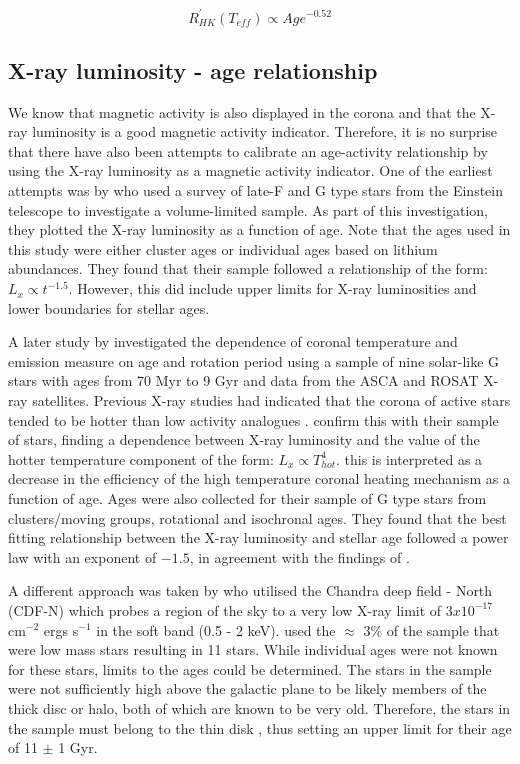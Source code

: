 \begin{equation}
    R^{'}_{HK}(T_{eff}) \propto Age^{-0.52}
    \label{Eq:LO_etal_18_law}
\end{equation}

\subsection{X-ray luminosity - age relationship}
\label{hist_xray_age_section}
We know that magnetic activity is also displayed in the corona and that the X-ray luminosity is a good magnetic activity indicator. Therefore, it is no surprise that there have also been attempts to calibrate an age-activity relationship by using the X-ray luminosity as a magnetic activity indicator. One of the earliest attempts was by \citet{Maggio_etal_1987} who used a survey of late-F and G type stars from the Einstein telescope to investigate a volume-limited sample. As part of this investigation, they plotted the X-ray luminosity as a function of age. Note that the ages used in this study were either cluster ages or individual ages based on lithium abundances. They found that their sample followed a relationship of the form: $L_{x} \propto t^{-1.5}$. However, this did include upper limits for X-ray luminosities and lower boundaries for stellar ages.

A later study by \citet{Gudel_etal_1997} investigated the dependence of coronal temperature and emission measure on age and rotation period using a sample of nine solar-like G stars with ages from 70 Myr to 9 Gyr and data from the ASCA and ROSAT X-ray satellites. Previous X-ray studies had indicated that the corona of active stars tended to be hotter than low activity analogues \citep{Schmitt_etal_1995}. \citet{Gudel_etal_1997} confirm this with their sample of stars, finding a dependence between X-ray luminosity and the value of the hotter temperature component of the form: $L_{x} \propto T_{hot}^{4}$. this is interpreted as a decrease in the efficiency of the high temperature coronal heating mechanism as a function of age. Ages were also collected for their sample of G type stars from clusters/moving groups, rotational and isochronal ages. They found that the best fitting relationship between the X-ray luminosity and stellar age followed a power law with an exponent of $-1.5$, in agreement with the findings of \citet{Maggio_etal_1987}.

A different approach was taken by \citet{Feigelson_etal_2004} who utilised the Chandra deep field - North (CDF-N) which probes a region of the sky to a very low X-ray limit of $3 x 10^{-17}$ cm$^{-2}$ ergs s$^{-1}$ in the soft band (0.5 - 2 keV). \citet{Feigelson_etal_2004} used the $\approx$ 3\% of the sample that were low mass stars resulting in 11 stars. While individual ages were not known for these stars, limits to the ages could be determined. The stars in the sample were not sufficiently high above the galactic plane to be likely members of the thick disc or halo, both of which are known to be very old. Therefore, the stars in the sample must belong to the thin disk , thus setting an upper limit for their age of 11 $\pm$ 1 Gyr.

